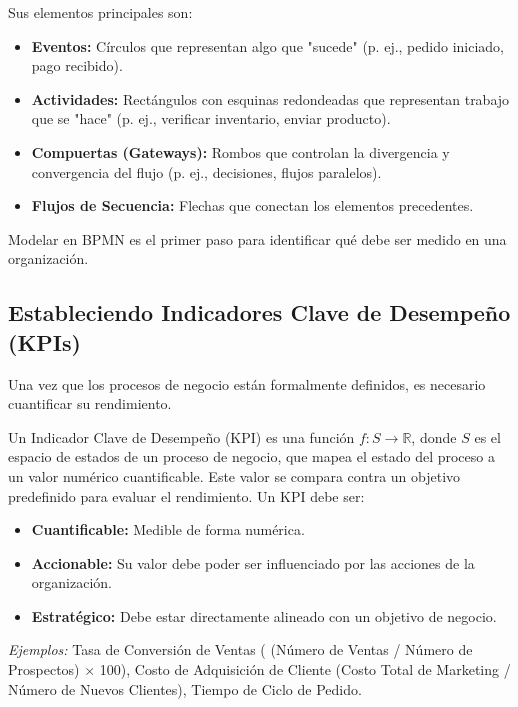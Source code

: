 \documentclass{article}
\newenvironment{definition}[1][Definición]{\begin{trivlist}
\item[\hskip \labelsep {\bfseries #1}]}{\end{trivlist}}
\begin{document}
Sus elementos principales son:
\begin{itemize}
    \item \textbf{Eventos:} Círculos que representan algo que "sucede" (p. ej., pedido iniciado, pago recibido).
    \item \textbf{Actividades:} Rectángulos con esquinas redondeadas que representan trabajo que se "hace" (p. ej., verificar inventario, enviar producto).
    \item \textbf{Compuertas (Gateways):} Rombos que controlan la divergencia y convergencia del flujo (p. ej., decisiones, flujos paralelos).
    \item \textbf{Flujos de Secuencia:} Flechas que conectan los elementos precedentes.
\end{itemize}
Modelar en BPMN es el primer paso para identificar qué debe ser medido en una organización.

\subsection{Estableciendo Indicadores Clave de Desempeño (KPIs)}
Una vez que los procesos de negocio están formalmente definidos, es necesario cuantificar su rendimiento.
\begin{definition}[Indicador Clave de Desempeño (KPI)]
Un Indicador Clave de Desempeño (KPI) es una función $f: S \to \mathbb{R}$, donde $S$ es el espacio de estados de un proceso de negocio, que mapea el estado del proceso a un valor numérico cuantificable. Este valor se compara contra un objetivo predefinido para evaluar el rendimiento. Un KPI debe ser:
\begin{itemize}
    \item \textbf{Cuantificable:} Medible de forma numérica.
    \item \textbf{Accionable:} Su valor debe poder ser influenciado por las acciones de la organización.
    \item \textbf{Estratégico:} Debe estar directamente alineado con un objetivo de negocio.
\end{itemize}
\end{definition}
\textit{Ejemplos:} Tasa de Conversión de Ventas ( (Número de Ventas / Número de Prospectos) $\times$ 100), Costo de Adquisición de Cliente (Costo Total de Marketing / Número de Nuevos Clientes), Tiempo de Ciclo de Pedido.
\end{document}
